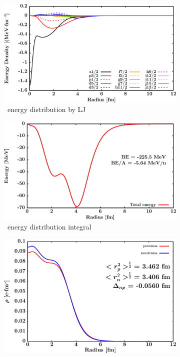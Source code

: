 \begin{figure}[hbtp]
    \begin{subfigure}{0.45\textwidth}
        \centering
        \includegraphics[width=\linewidth]{figures/ca40_EnergyDist.png}
        \caption{\caForty\ energy distribution by LJ}
        \label{DOMFitData_ca40_proton_energyDistInt}
    \end{subfigure}\hspace{6pt}
    \begin{subfigure}{0.45\textwidth}
        \centering
        \includegraphics[width=\linewidth]{figures/ca40_EnergyDistIntegral.png}
        \caption{\caForty\ energy distribution integral}
        \label{DOMFitData_ca40_neutron_energyDistInt}
    \end{subfigure}\vspace{0.4in}
    \begin{subfigure}{0.70\textwidth}
        \centering
        \includegraphics[width=\linewidth]{figures/ca40_matterDensity.png}

\end{subfigure}
\end{figure}
